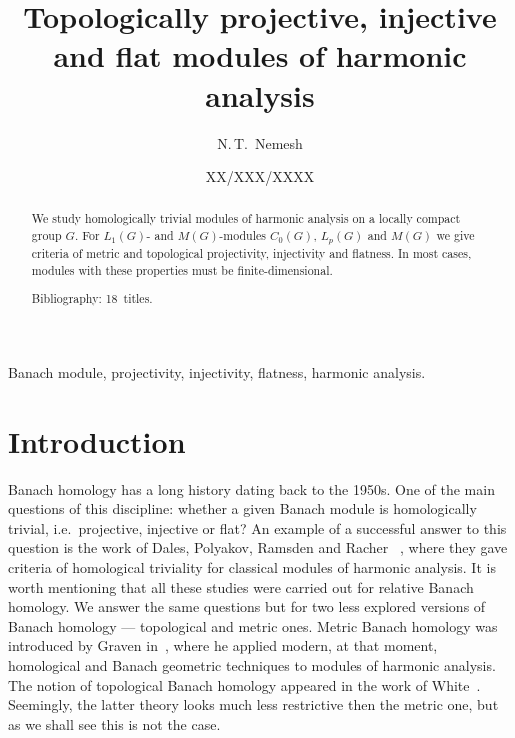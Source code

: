 \documentclass{article}
\theoremstyle{plain}
\theoremstyle{definition}
\begin{document}
\title{Topologically projective, injective and flat modules of harmonic
    analysis}
\author[Norbert~T.~Nemesh]{N.\,T.~Nemesh}
\address{Faculty of Mechanics and Mathematics,\\
Moscow State University}


\date{XX/XXX/XXXX}


\maketitle  


\begin{fulltext}

\begin{abstract}
We study homologically trivial modules of harmonic analysis on a locally compact
group $G$. For $L_1(G)$- and $M(G)$-modules $C_0(G)$, $L_p(G)$ and $M(G)$ we
give criteria of metric and topological projectivity, injectivity and flatness.
In most cases, modules with these properties must be finite-dimensional.

Bibliography: 18~titles.
\end{abstract}

\begin{keywords}
Banach module, projectivity, injectivity, flatness, harmonic analysis.
\end{keywords}



\section{Introduction}\label{SectionIntroduction}

Banach homology has a long history dating back to the 1950s. One of the main
questions of this discipline: whether a given Banach module is homologically
trivial, i.e.\ projective, injective or flat? An example of a successful answer
to this question is the work of Dales, Polyakov, Ramsden and Racher
~\cite{DalPolHomolPropGrAlg, RamsHomPropSemgroupAlg,RachInjModAndAmenGr}, where
they gave criteria of homological triviality for classical modules of harmonic
analysis. It is worth mentioning that all these studies were carried out for
relative Banach homology. We answer the same questions but for two less explored
versions of Banach homology --- topological and metric ones. Metric Banach
homology was introduced by Graven in~\cite{GravInjProjBanMod}, where he applied
modern, at that moment, homological and Banach geometric techniques to modules
of harmonic analysis. The notion of topological Banach homology appeared in the
work of White~\cite{WhiteInjmoduAlg}. Seemingly, the latter theory looks much
less restrictive then the metric one, but as we shall see this is not the case.


\end{fulltext}
\end{document}
